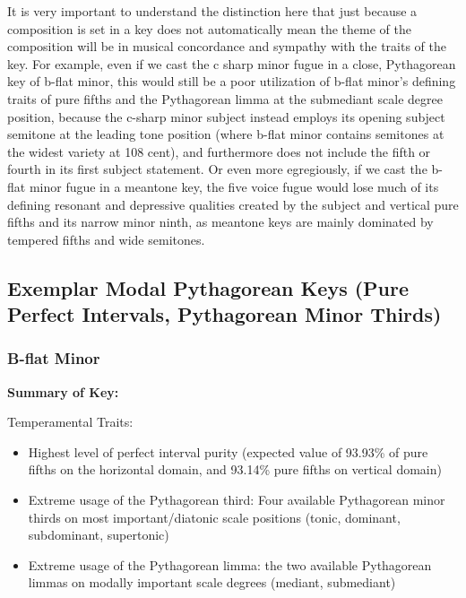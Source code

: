 It is very important to understand the distinction here that just
because a composition is set in a key does not automatically mean the
theme of the composition will be in musical concordance and sympathy
with the traits of the key. For example, even if we cast the c sharp
minor fugue in a close, Pythagorean key of b-flat minor, this would
still be a poor utilization of b-flat minor's defining traits of pure
fifths and the Pythagorean limma at the submediant scale degree
position, because the c-sharp minor subject instead employs its opening
subject semitone at the leading tone position (where b-flat minor
contains semitones at the widest variety at 108 cent), and furthermore
does not include the fifth or fourth in its first subject statement. Or
even more egregiously, if we cast the b-flat minor fugue in a meantone
key, the five voice fugue would lose much of its defining resonant and
depressive qualities created by the subject and vertical pure fifths and
its narrow minor ninth, as meantone keys are mainly dominated by
tempered fifths and wide semitones.

    \subsection{Exemplar Modal Pythagorean Keys (Pure Perfect Intervals,
Pythagorean Minor
Thirds)}\label{exemplar-modal-pythagorean-keys-pure-perfect-intervals-pythagorean-minor-thirds}

    \subsubsection{B-flat Minor}\label{b-flat-minor}

\textbf{Summary of Key:}


    \begin{center}
    \end{center}
    
    Temperamental Traits:

\begin{itemize}
\tightlist
\item
  Highest level of perfect interval purity (expected value of 93.93\% of
  pure fifths on the horizontal domain, and 93.14\% pure fifths on
  vertical domain)
\item
  Extreme usage of the Pythagorean third: Four available Pythagorean
  minor thirds on most important/diatonic scale positions (tonic,
  dominant, subdominant, supertonic)
\item
  Extreme usage of the Pythagorean limma: the two available Pythagorean
  limmas on modally important scale degrees (mediant, submediant)
\end{itemize}


